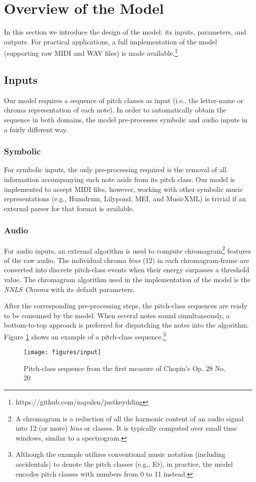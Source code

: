 \documentclass[sigconf]{acmart}
\begin{document}
\section{Overview of the Model}
In this section we introduce the design of the model: its inputs, parameters, and outputs. For practical applications, a full implementation of the model (supporting raw MIDI and WAV files) is made available.\footnote{https://github.com/napulen/justkeydding}

\subsection{Inputs}
Our model requires a sequence of pitch classes as input (i.e., the letter-name or chroma representation of each note). In order to automatically obtain the sequence in both domains, the model pre-processes symbolic and audio inputs in a fairly different way.

\subsubsection{Symbolic} \label{symbolicinput}
For symbolic inputs, the only pre-processing required is the removal of all information accompanying each note aside from its pitch class. Our model is implemented to accept MIDI files, however, working with other symbolic music representations (e.g., Humdrum, Lilypond, MEI, and MusicXML) is trivial if an external parser for that format is available.
\subsubsection{Audio} \label{audioinput}
For audio inputs, an external algorithm is used to compute chromagram\footnote{A chromagram is a reduction of all the harmonic content of an audio signal into 12 (or more) \emph{bins} or classes. It is typically computed over small time windows, similar to a spectrogram.} features of the raw audio. The individual chroma \emph{bins} (12) in each chromagram-frame are converted into discrete pitch-class events when their energy surpasses a threshold value. The chromagram algorithm used in the implementation of the model is the \emph{NNLS Chroma} \cite{mauch2010} with its default parameters.

After the corresponding pre-processing steps, the pitch-class sequences are ready to be consumed by the model. When several notes sound simultaneously, a bottom-to-top approach is preferred for dispatching the notes into the algorithm. Figure \ref{fig:input} shows an example of a pitch-class sequence.\footnote{Although the example utilizes conventional music notation (including accidentals) to denote the pitch classes (e.g., E$\flat$), in practice, the model encodes pitch classes with numbers from 0 to 11 instead.}
\begin{figure}[ht]
  \centering
  \texttt{[image: figures/input]}
  \caption{Pitch-class sequence from the first measure of Chopin's Op. 28 No. 20}
  \label{fig:input}
\end{figure}
\end{document}
